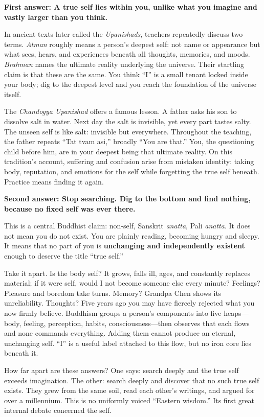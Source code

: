 \textbf{First answer: A true self lies within you, unlike what you imagine and vastly larger than you think.}

In ancient texts later called the \textit{Upanishads}, teachers repeatedly discuss two terms. \textit{Atman} roughly means a person's deepest self: not name or appearance but what sees, hears, and experiences beneath all thoughts, memories, and moods. \textit{Brahman} names the ultimate reality underlying the universe. Their startling claim is that these are the same. You think ``I'' is a small tenant locked inside your body; dig to the deepest level and you reach the foundation of the universe itself.

The \textit{Chandogya Upanishad} offers a famous lesson. A father asks his son to dissolve salt in water. Next day the salt is invisible, yet every part tastes salty. The unseen self is like salt: invisible but everywhere. Throughout the teaching, the father repeats ``Tat tvam asi,'' broadly ``You are that.'' You, the questioning child before him, are in your deepest being that ultimate reality. On this tradition's account, suffering and confusion arise from mistaken identity: taking body, reputation, and emotions for the self while forgetting the true self beneath. Practice means finding it again.

\textbf{Second answer: Stop searching. Dig to the bottom and find nothing, because no fixed self was ever there.}

This is a central Buddhist claim: non-self, Sanskrit \textit{anatta}, Pali \textit{anatta}. It does not mean you do not exist. You are plainly reading, becoming hungry and sleepy. It means that no part of you is \textbf{unchanging and independently existent} enough to deserve the title ``true self.''

Take it apart. Is the body self? It grows, falls ill, ages, and constantly replaces material; if it were self, would I not become someone else every minute? Feelings? Pleasure and boredom take turns. Memory? Grandpa Chen shows its unreliability. Thoughts? Five years ago you may have fiercely rejected what you now firmly believe. Buddhism groups a person's components into five heaps---body, feeling, perception, habits, consciousness---then observes that each flows and none commands everything. Adding them cannot produce an eternal, unchanging self. ``I'' is a useful label attached to this flow, but no iron core lies beneath it.

How far apart are these answers? One says: search deeply and the true self exceeds imagination. The other: search deeply and discover that no such true self exists. They grew from the same soil, read each other's writings, and argued for over a millennium. This is no uniformly voiced ``Eastern wisdom.'' Its first great internal debate concerned the self.

